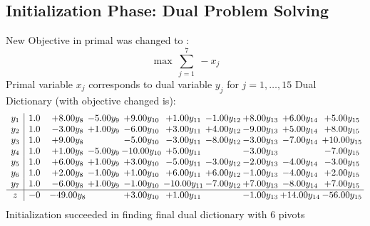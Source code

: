 \documentclass[9pt]{article}
\begin{document}
\subsection{Initialization Phase: Dual Problem Solving}
New Objective in primal was changed to : \[ \max\ \sum_{j=1}^{7}\ - x_j \] 
Primal variable $x_j$ corresponds to dual variable $y_j$ for $j = 1,\ldots,15$
Dual Dictionary (with objective changed is): 
\[\begin{array}{c| c c@{\hskip 2pt} c@{\hskip 2pt} c@{\hskip 2pt} c@{\hskip 2pt} c@{\hskip 2pt} c@{\hskip 2pt} c@{\hskip 2pt} c@{\hskip 2pt} }
 y_{1}   &  1.0 & +  8.00 y_{8} & -5.00 y_{9} & +  9.00 y_{10} & +  1.00 y_{11} & -1.00 y_{12} & +  8.00 y_{13} & +  6.00 y_{14} & +  5.00 y_{15}\\
 y_{2}   &  1.0 & -3.00 y_{8} & +  1.00 y_{9} & -6.00 y_{10} & +  3.00 y_{11} & +  4.00 y_{12} & -9.00 y_{13} & +  5.00 y_{14} & +  8.00 y_{15}\\
 y_{3}   &  1.0 & +  9.00 y_{8} &   & -5.00 y_{10} & -3.00 y_{11} & -8.00 y_{12} & -3.00 y_{13} & -7.00 y_{14} & + 10.00 y_{15}\\
 y_{4}   &  1.0 & +  1.00 y_{8} & -5.00 y_{9} & -10.00 y_{10} & +  5.00 y_{11} &   & -3.00 y_{13} &   & -7.00 y_{15}\\
 y_{5}   &  1.0 & +  6.00 y_{8} & +  1.00 y_{9} & +  3.00 y_{10} & -5.00 y_{11} & -3.00 y_{12} & -2.00 y_{13} & -4.00 y_{14} & -3.00 y_{15}\\
 y_{6}   &  1.0 & +  2.00 y_{8} & -1.00 y_{9} & +  1.00 y_{10} & +  6.00 y_{11} & +  6.00 y_{12} & -1.00 y_{13} & -4.00 y_{14} & +  2.00 y_{15}\\
 y_{7}   &  1.0 & -6.00 y_{8} & +  1.00 y_{9} & -1.00 y_{10} & -10.00 y_{11} & -7.00 y_{12} & +  7.00 y_{13} & -8.00 y_{14} & +  7.00 y_{15}\\
\hline
z    &  -0 & -49.00 y_{8} &   & +  3.00 y_{10} & +  1.00 y_{11} &   & -1.00 y_{13} & + 14.00 y_{14} & -56.00 y_{15}\\
\end{array}\]
Initialization succeeded in finding final dual dictionary with 6 pivots
\end{document}
